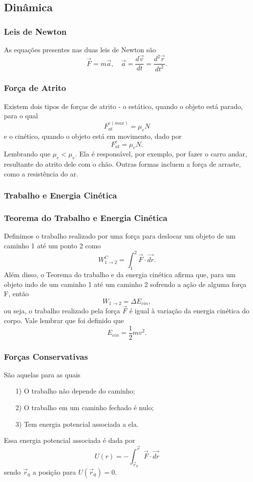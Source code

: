 \documentclass{article}
\begin{document}
\subsection{Dinâmica}
\subsubsection{Leis de Newton}
  As equa\c cões presentes nas duas leis de Newton são 
    \[
      \vec{F} = m \vec{a},\quad \vec{a} = \frac{d \vec{v}}{dt}= \frac{d^{2}\vec{r}}{dt^{2}}.
    \]
\subsubsection{For\c ca de Atrito}
  Existem dois tipos de for\c cas de atrito - o estático, quando o objeto está parado, para o qual 
    \[
      F_{at}^{e(max)} = \mu_{e}N
    \]
  e o cinético, quando o objeto está em movimento, dado por 
    \[
      F_{at}^{c} = \mu_{c}N.
    \]
  Lembrando que \(\mu_{c} < \mu_{e}\). Ela é responsável, por exemplo, por fazer
o carro andar, resultante do atrito dele com o chão. Outras formas incluem a for\c ca de 
arraste, como a resistência do ar.

\subsubsection{Trabalho e Energia Cinética}
\subsubsection{Teorema do Trabalho e Energia Cinética}
  Definimos o trabalho realizado por uma for\c ca para deslocar um objeto de um caminho 1 até 
um ponto 2 como 
  \[
    W_{1\rightarrow2}^{C} = \int_{1}^{2}\vec{F}\cdot \vec{dr}.
  \]
  Além disso, o Teorema do trabalho e da energia cinética afirma que, para um objeto indo de um
caminho 1 até um caminho 2 sofrendo a a\c cão de alguma for\c ca F, então
    \[
      W_{1\rightarrow2} = \Delta E_{cin},
    \]
  ou seja, o trabalho realizado pela for\c ca \(\vec{F}\) é igual à varia\c cão
da energia cinética do corpo. Vale lembrar que foi definido que 
  \[
    E_{cin}=\frac{1}{2}mv^{2}.
  \]
\subsubsection{For\c cas Conservativas}
  São aquelas para as quais
 \begin{itemize}
   \item[1)] O trabalho não depende do caminho;
   \item[2)] O trabalho em um caminho fechado é nulo;
   \item[3)] Tem energia potencial associada a ela.
 \end{itemize}
  Essa energia potencial associada é dada por 
    \[
      U(r) = -\int_{\vec{r}_{0}}^{\vec{r}}\vec{F}\cdot \vec{dr}
    \]
  sendo \(\vec{r}_{0}\) a posi\c cão para \(U(\vec{r}_{0}) = 0.\)
\end{document}
